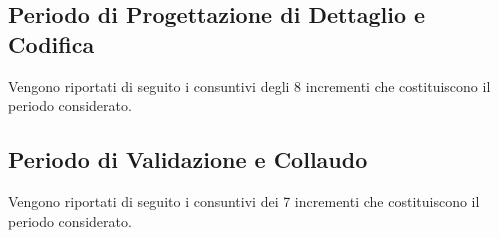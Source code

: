 \subsection{Periodo di Progettazione di Dettaglio e Codifica}
Vengono riportati di seguito i consuntivi degli 8 incrementi che costituiscono il periodo considerato. 











\subsection{Periodo di Validazione e Collaudo}
Vengono riportati di seguito i consuntivi dei 7 incrementi che costituiscono il periodo considerato. 





